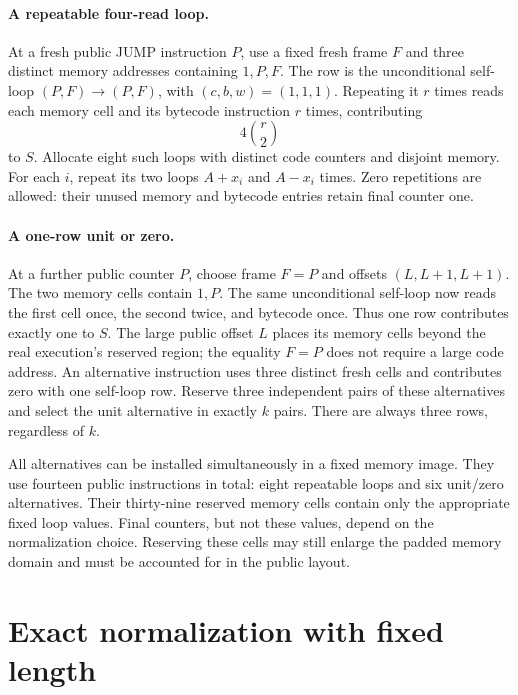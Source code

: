 \documentclass[11pt]{article}
\begin{document}
\paragraph{A repeatable four-read loop.} At a fresh public JUMP instruction $P$, use a fixed fresh frame $F$ and three distinct memory addresses containing $1,P,F$. The row is the unconditional self-loop $(P,F)\to(P,F)$, with $(c,b,w)=(1,1,1)$. Repeating it $r$ times reads each memory cell and its bytecode instruction $r$ times, contributing
\[
 4\binom r2
\]
to $S$. Allocate eight such loops with distinct code counters and disjoint memory. For each $i$, repeat its two loops $A+x_i$ and $A-x_i$ times. Zero repetitions are allowed: their unused memory and bytecode entries retain final counter one.

\paragraph{A one-row unit or zero.} At a further public counter $P$, choose frame $F=P$ and offsets $(L,L+1,L+1)$. The two memory cells contain $1,P$. The same unconditional self-loop now reads the first cell once, the second twice, and bytecode once. Thus one row contributes exactly one to $S$. The large public offset $L$ places its memory cells beyond the real execution's reserved region; the equality $F=P$ does not require a large code address. An alternative instruction uses three distinct fresh cells and contributes zero with one self-loop row. Reserve three independent pairs of these alternatives and select the unit alternative in exactly $k$ pairs. There are always three rows, regardless of $k$.

All alternatives can be installed simultaneously in a fixed memory image. They use fourteen public instructions in total: eight repeatable loops and six unit/zero alternatives. Their thirty-nine reserved memory cells contain only the appropriate fixed loop values. Final counters, but not these values, depend on the normalization choice. Reserving these cells may still enlarge the padded memory domain and must be accounted for in the public layout.

\section{Exact normalization with fixed length}
\end{document}
